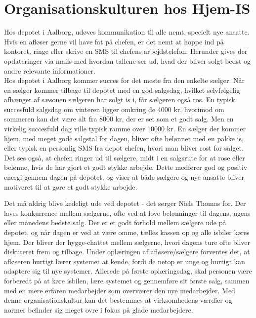 \section{Organisationskulturen hos Hjem-IS}
Hos depotet i Aalborg, udøves kommunikation til alle nemt, specielt nye ansatte. Hvis en afløser gerne vil have fat på chefen, er det nemt at hoppe ind på kontoret, ringe eller skrive en SMS til chefens arbejdstelefon. Herunder gives der opdateringer via mails med hvordan tallene ser ud, hvad der bliver solgt bedst og andre relevante informationer. \\
Hos depotet i Aalborg kommer succes for det meste fra den enkelte sælger. Når en sælger kommer tilbage til depotet med en god salgsdag, hvilket selvfølgelig afhænger af sæsonen sælgeren har solgt is i, får sælgeren også ros. En typisk succesfuld salgsdag om vinteren ligger omkring de 4000 kr, hvorimod om sommeren kan det være alt fra 8000 kr, der er set som et godt salg. Men en virkelig succesfuld dag ville typisk ramme over 10000 kr. En sælger der kommer hjem, med meget gode salgstal for dagen, bliver ofte belønnet med en pakke is, eller typisk en personlig SMS fra depot chefen, hvori man bliver rost for salget. Det ses også, at chefen ringer ud til sælgere, midt i en salgsrute for at rose eller belønne, hvis de har gjort et godt stykke arbejde. Dette medfører god og positiv energi gennem dagen på depotet, og viser at både sælgere og nye ansatte bliver motiveret til at gøre et godt stykke arbejde. 

Det må aldrig blive kedeligt ude ved depotet - det sørger Niels Thomas for. Der laves konkurrence mellem sælgerne, ofte ved at love belønninger til dagens, ugens eller månedens bedste salg. Der er et godt forhold mellem sælgere ude på depotet, og når dagen er ved at være omme, tælles kassen op og alle isbiler køres hjem. Der bliver der hygge-chattet mellem sælgerne, hvori dagens ture ofte bliver diskuteret frem og tilbage. Under oplæringen af afløsere/sælgere forventes det, at afløseren hurtigt lærer systemet at kende, fordi de netop er unge og hurtigt kan adaptere sig til nye systemer. Allerede på første oplæringsdag, skal personen være forberedt på at køre isbilen, lære systemet og gennemføre sit første salg, sammen med en mere erfaren medarbejder som overværer den nye medarbejder. Med denne organisationskultur kan det bestemmes at virksomhedens værdier og normer befinder sig meget ovre i fokus på glade medarbejdere.


